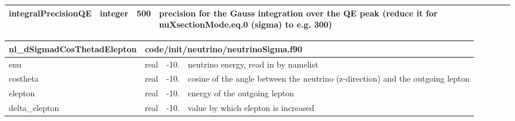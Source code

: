 \documentclass{article}
\begin{document}
\begin{longtable}{llll}
\midrule
integralPrecisionQE & \begin{minipage}[t]{2cm}integer\end{minipage} & \begin{minipage}[t]{2cm}500\end{minipage} & \begin{minipage}[t]{12cm}precision for the Gauss integration over the QE peak (reduce it for nuXsectionMode.eq.0 (sigma) to e.g. 300)\end{minipage}\\*
\bottomrule
\end{longtable}
{ }




\begin{longtable}{llll}
\toprule
\textbf{\large{nl\_dSigmadCosThetadElepton}} & \multicolumn{3}{l}{\footnotesize{code/init/neutrino/neutrinoSigma.f90}}\\*
\midrule
\endfirsthead
\midrule
\endhead
enu & \begin{minipage}[t]{2cm}real\end{minipage} & \begin{minipage}[t]{2cm}-10.\end{minipage} & \begin{minipage}[t]{12cm}neutrino energy, read in by namelist\end{minipage}\\*
\midrule
costheta & \begin{minipage}[t]{2cm}real\end{minipage} & \begin{minipage}[t]{2cm}-10.\end{minipage} & \begin{minipage}[t]{12cm}cosine of the angle between the neutrino (z-direction) and the outgoing lepton\end{minipage}\\*
\midrule
elepton & \begin{minipage}[t]{2cm}real\end{minipage} & \begin{minipage}[t]{2cm}-10.\end{minipage} & \begin{minipage}[t]{12cm}energy of the outgoing lepton\end{minipage}\\*
\midrule
delta\_elepton & \begin{minipage}[t]{2cm}real\end{minipage} & \begin{minipage}[t]{2cm}-10.\end{minipage} & \begin{minipage}[t]{12cm}value by which elepton is increased\end{minipage}\\*
\bottomrule
\end{longtable}
{ }
\end{document}
